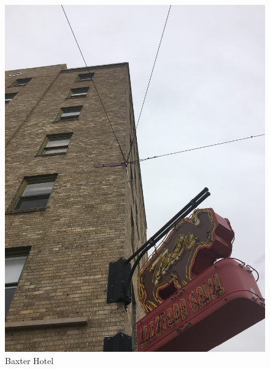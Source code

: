 \documentclass[10pt,letterpaper]{article}
\begin{document}
\begin{figure}[h]
	\centering
		\begin{minipage}[b]{0.25\textwidth}
			\includegraphics[width=\textwidth]{house4pic1.jpg}
    		\caption{Baxter Hotel}
  		\end{minipage}
  \hfill
  		\begin{minipage}[b]{0.25\textwidth}

\end{minipage}
\end{figure}
\end{document}
